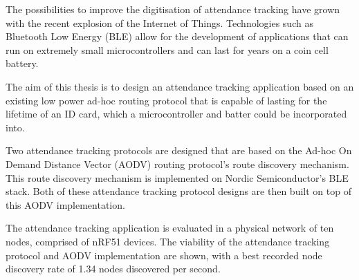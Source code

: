 \begin{thesisabstract}

The possibilities to improve the digitisation of attendance tracking have grown
with the recent explosion of the Internet of Things. Technologies
such as Bluetooth Low Energy (BLE) allow for the development of applications that
can run on extremely small microcontrollers and can last for years on a
coin cell battery.

The aim of this thesis is to design an attendance tracking application based on
an existing low power ad-hoc routing protocol that is capable of lasting for the
lifetime of an ID card, which a microcontroller and batter could be incorporated into.

Two attendance tracking protocols are designed that are based on the Ad-hoc On Demand
Distance Vector (AODV) routing protocol's route discovery mechanism. This route
discovery mechanism is implemented on Nordic Semiconductor's BLE stack. Both of these attendance
tracking protocol designs are then built on top of this AODV implementation.

The attendance tracking application is evaluated in a physical network of ten nodes,
comprised of nRF51 devices. The viability of the attendance tracking protocol
and AODV implementation are shown, with a best recorded node discovery rate of 1.34
nodes discovered per second.

\end{thesisabstract}
